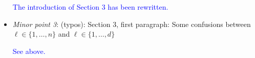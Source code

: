 \documentclass[10pt]{article}
\newcommand{\response}[1]{\textcolor{blue}{#1}}
\begin{document}
\begin{itemize}
\response{The introduction of Section 3 has been rewritten.}

    \item \emph{Minor point 3}: (typos): Section 3, first paragraph: Some confusions between 
        $\ell \in \lbrace 1,\ldots, n\rbrace$ and $\ell \in \lbrace 1,\ldots,d\rbrace$

\response{See above.}
\end{itemize}


\end{document}
